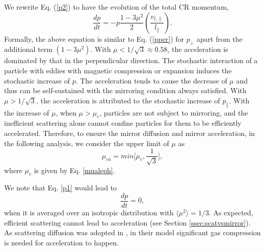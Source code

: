 \documentclass[preprint2,twocolumn,times,tighten]{aastex63}
\begin{document}
{We rewrite {Eq. (\ref{p2})} to have the evolution of the total CR momentum,
\begin{equation}
\frac{d p}{dt}= -p \frac{1-3\mu^2}{2} \left(\frac{v_{l,\|}}{l_\|}\right).
\label{p1}
\end{equation}
{Formally}, the above equation is similar to Eq. (\ref{pper}) for $p_\perp$ apart from the %
{additional term $(1-3\mu^2)$.}
With $\mu<1/\sqrt{3} \approx 0.58$, 
the acceleration is dominated by that in the perpendicular direction.
The stochastic interaction of a particle with eddies with magnetic compression or expansion
induces the {stochastic} increase of $p$.
The acceleration tends to cause the decrease of $\mu$ and thus can be self-sustained with the mirroring condition always satisfied. 
With $\mu>1/\sqrt{3}$, 
the acceleration is attributed to the stochastic increase of 
$p_\|$.
With the increase of $\mu$, when $\mu>\mu_c$,
particles are not subject to mirroring, and the inefficient scattering alone cannot confine particles for them to be efficiently accelerated. 
Therefore, 
to ensure the mirror diffusion and mirror acceleration, 
in the following analysis, we consider 
the upper limit of $\mu$ as
\begin{equation}
    \mu_{ca}=min\Big[\mu_{c}, \frac{1}{\sqrt{3}}\Big],
    \label{MUC}
\end{equation}
where $\mu_c$ is given by Eq. \eqref{mualeph}.


We note that Eq. \eqref{p1} would lead to 
\begin{equation}
   \frac{dp}{dt} = 0 , 
\end{equation}
when it is averaged over an isotropic distribution with $\langle \mu^2 \rangle = 1/3$. 
As expected, efficient scattering cannot lead to acceleration
(see Section \ref{ssec:scatvsmirror}).
As scattering diffusion was adopted in 
\citet{CL06},
in their model 
significant gas compression is needed 
for acceleration to happen. 







}
\end{document}
